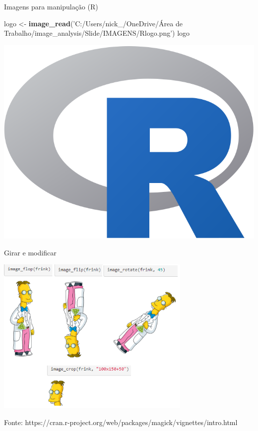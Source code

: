 \documentclass[
  ignorenonframetext,
]{beamer}
\newenvironment{Shaded}{\begin{snugshade}}{\end{snugshade}}
\newcommand{\KeywordTok}[1]{\textcolor[rgb]{0.13,0.29,0.53}{\textbf{#1}}}
\newcommand{\NormalTok}[1]{#1}
\newcommand{\StringTok}[1]{\textcolor[rgb]{0.31,0.60,0.02}{#1}}
\begin{document}
\begin{frame}[fragile]{Imagens para manipulação (R)}
\protect\hypertarget{imagens-para-manipulauxe7uxe3o-r}{}

\begin{Shaded}
\begin{Highlighting}[]
\NormalTok{logo <-}\StringTok{ }\KeywordTok{image_read}\NormalTok{(}\StringTok{'C:/Users/nick_/OneDrive/Área de Trabalho/image_analysis/Slide/IMAGENS/Rlogo.png'}\NormalTok{)}
\NormalTok{logo}
\end{Highlighting}
\end{Shaded}

\includegraphics[width=10.06in]{SLIDES_files/figure-beamer/5.1.2-1}

\end{frame}

\begin{frame}{Girar e modificar}
\protect\hypertarget{girar-e-modificar}{}

\small

\includegraphics[width=3.7in]{IMAGENS/girar_modificar}

\begin{center}
\tiny{Fonte: https://cran.r-project.org/web/packages/magick/vignettes/intro.html}
\end{center}

\end{frame}
\end{document}
